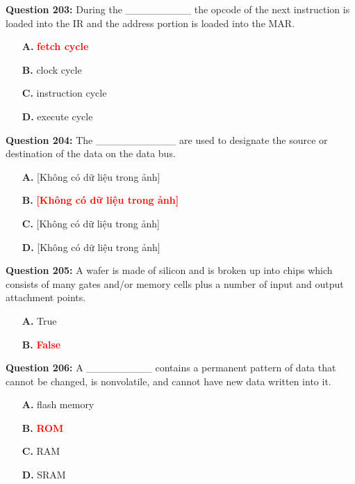\documentclass[12pt,a4paper]{article}
\begin{document}
\vspace{0.5cm}

\textbf{Question 203:} During the _________ the opcode of the next instruction is loaded into the IR and the address portion is loaded into the MAR.

\begin{itemize}
    \item[\textbf{A.}] \textcolor{red}{\textbf{fetch cycle}}
    \item[\textbf{B.}] clock cycle
    \item[\textbf{C.}] instruction cycle
    \item[\textbf{D.}] execute cycle
\end{itemize}

\vspace{0.5cm}

\textbf{Question 204:} The ___________ are used to designate the source or destination of the data on the data bus.

\begin{itemize}
    \item[\textbf{A.}] [Không có dữ liệu trong ảnh]
    \item[\textbf{B.}] \textcolor{red}{\textbf{[Không có dữ liệu trong ảnh]}}
    \item[\textbf{C.}] [Không có dữ liệu trong ảnh]
    \item[\textbf{D.}] [Không có dữ liệu trong ảnh]
\end{itemize}

\vspace{0.5cm}

\textbf{Question 205:} A wafer is made of silicon and is broken up into chips which consists of many gates and/or memory cells plus a number of input and output attachment points.

\begin{itemize}
    \item[\textbf{A.}] True
    \item[\textbf{B.}] \textcolor{red}{\textbf{False}}
\end{itemize}

\vspace{0.5cm}

\textbf{Question 206:} A _________ contains a permanent pattern of data that cannot be changed, is nonvolatile, and cannot have new data written into it.

\begin{itemize}
    \item[\textbf{A.}] flash memory
    \item[\textbf{B.}] \textcolor{red}{\textbf{ROM}}
    \item[\textbf{C.}] RAM
    \item[\textbf{D.}] SRAM
\end{itemize}
\end{document}
